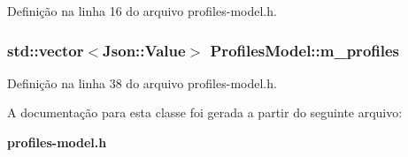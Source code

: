 Definição na linha 16 do arquivo profiles-\/model.\+h.

\subsubsection[{m\+\_\+profiles}]{\setlength{\rightskip}{0pt plus 5cm}std\+::vector$<$Json\+::\+Value$>$ Profiles\+Model\+::m\+\_\+profiles\hspace{0.3cm}{\ttfamily [protected]}}\label{class_profiles_model_a05540eae33d78259b6126d2d5997524e}


Definição na linha 38 do arquivo profiles-\/model.\+h.



A documentação para esta classe foi gerada a partir do seguinte arquivo\+:\begin{DoxyCompactItemize}
\item 
{\bf profiles-\/model.\+h}\end{DoxyCompactItemize}
